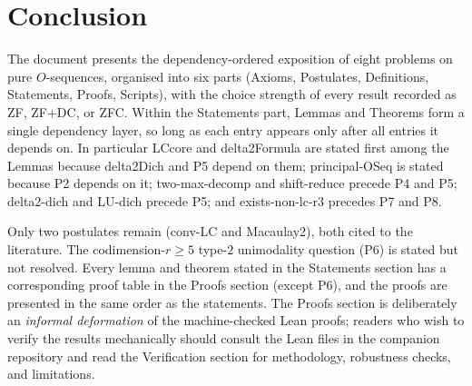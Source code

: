 \documentclass[11pt,reqno]{amsart}
\begin{document}

\section{Conclusion}

\noindent The document presents the dependency-ordered exposition of eight
problems on pure $O$-sequences, organised into six parts (Axioms,
Postulates, Definitions, Statements, Proofs, Scripts), with the choice
strength of every result recorded as \textsf{ZF}, \textsf{ZF+DC}, or \textsf{%
ZFC}. Within the Statements part, Lemmas and Theorems form a single
dependency layer, so long as each entry appears only after all entries it
depends on. In particular \textsf{LCcore} and \textsf{delta2Formula} are
stated first among the Lemmas because \textsf{delta2Dich} and \textsf{P5}
depend on them; \textsf{principal-OSeq} is stated because P2 depends on it; 
\textsf{two-max-decomp} and \textsf{shift-reduce} precede P4 and P5; \textsf{%
delta2-dich} and \textsf{LU-dich} precede P5; and \textsf{exists-non-lc-r3}
precedes P7 and P8.

Only two postulates remain (\textsf{conv-LC} and \textsf{Macaulay2}), both
cited to the literature. The codimension-$r \ge 5$ type-$2$ unimodality
question (P6) is stated but not resolved. Every lemma and theorem stated in
the Statements section has a corresponding proof table in the Proofs section
(except P6), and the proofs are presented in the same order as the
statements. The Proofs section is deliberately an \emph{informal deformation}
of the machine-checked Lean proofs; readers who wish to verify the results
mechanically should consult the Lean files in the companion repository and
read the Verification section for methodology, robustness checks, and
limitations.

\end{document}
